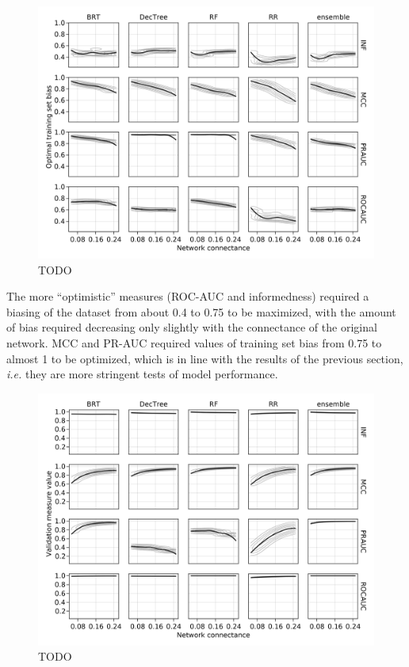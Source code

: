 \documentclass[11pt]{article}
\makeatletter
\def\maxwidth{\ifdim\Gin@nat@width>\linewidth\linewidth
\else\Gin@nat@width\fi}
\let\Oldincludegraphics\includegraphics
\renewcommand{\includegraphics}[1]{\Oldincludegraphics[width=\maxwidth]{#1}}
\makeatother
\begin{document}
\begin{figure}
\hypertarget{fig:optimbias}{%
\centering
\includegraphics{figures/optim_bias.png}
\caption{TODO}\label{fig:optimbias}
}
\end{figure}

The more ``optimistic'' measures (ROC-AUC and informedness) required a
biasing of the dataset from about 0.4 to 0.75 to be maximized, with the
amount of bias required decreasing only slightly with the connectance of
the original network. MCC and PR-AUC required values of training set
bias from 0.75 to almost 1 to be optimized, which is in line with the
results of the previous section, \emph{i.e.} they are more stringent
tests of model performance.

\begin{figure}
\hypertarget{fig:optimperf}{%
\centering
\includegraphics{figures/optim_perf.png}
\caption{TODO}\label{fig:optimperf}
}
\end{figure}
\end{document}
